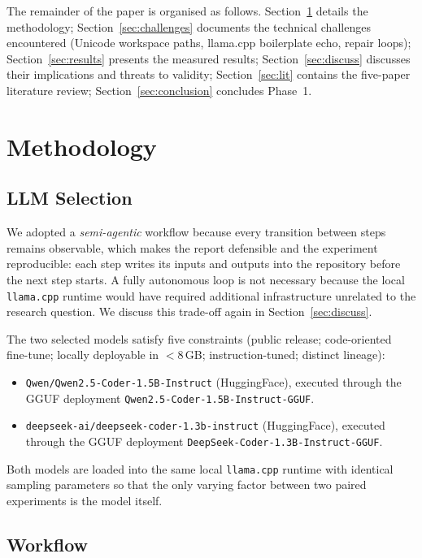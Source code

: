 \documentclass[journal]{IEEEtran}
\begin{document}
The remainder of the paper is organised as follows. Section~\ref{sec:method}
details the methodology; Section~\ref{sec:challenges} documents the technical
challenges encountered (Unicode workspace paths, llama.cpp boilerplate echo,
repair loops); Section~\ref{sec:results} presents the measured results;
Section~\ref{sec:discuss} discusses their implications and threats to
validity; Section~\ref{sec:lit} contains the five-paper literature review;
Section~\ref{sec:conclusion} concludes Phase~1.

\section{Methodology}\label{sec:method}

\subsection{LLM Selection}

We adopted a \emph{semi-agentic} workflow because every transition between
steps remains observable, which makes the report defensible and the
experiment reproducible: each step writes its inputs and outputs into the
repository before the next step starts. A fully autonomous loop is not
necessary because the local \texttt{llama.cpp} runtime would have required
additional infrastructure unrelated to the research question. We discuss
this trade-off again in Section~\ref{sec:discuss}.

The two selected models satisfy five constraints (public release;
code-oriented fine-tune; locally deployable in $<$8\,GB; instruction-tuned;
distinct lineage):
\begin{itemize}
    \item \texttt{Qwen/Qwen2.5-Coder-1.5B-Instruct} (HuggingFace), executed
        through the GGUF deployment \texttt{Qwen2.5-Coder-1.5B-Instruct-GGUF}.
    \item \texttt{deepseek-ai/deepseek-coder-1.3b-instruct} (HuggingFace),
        executed through the GGUF deployment \texttt{DeepSeek-Coder-1.3B-Instruct-GGUF}.
\end{itemize}
Both models are loaded into the same local \texttt{llama.cpp} runtime with
identical sampling parameters so that the only varying factor between two
paired experiments is the model itself.

\subsection{Workflow}
\end{document}
